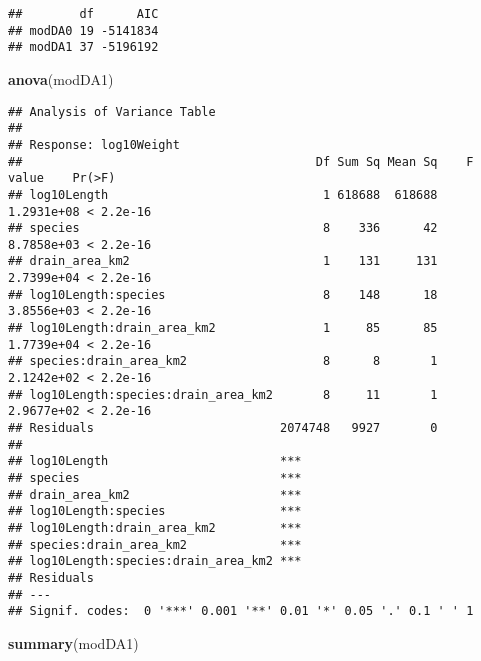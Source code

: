 \documentclass[
  landscape]{article}
\newenvironment{Shaded}{\begin{snugshade}}{\end{snugshade}}
\newcommand{\KeywordTok}[1]{\textcolor[rgb]{0.13,0.29,0.53}{\textbf{#1}}}
\newcommand{\NormalTok}[1]{#1}
\begin{document}
\begin{verbatim}
##        df      AIC
## modDA0 19 -5141834
## modDA1 37 -5196192
\end{verbatim}

\begin{Shaded}
\begin{Highlighting}[]
\KeywordTok{anova}\NormalTok{(modDA1)}
\end{Highlighting}
\end{Shaded}

\begin{verbatim}
## Analysis of Variance Table
## 
## Response: log10Weight
##                                         Df Sum Sq Mean Sq    F value    Pr(>F)
## log10Length                              1 618688  618688 1.2931e+08 < 2.2e-16
## species                                  8    336      42 8.7858e+03 < 2.2e-16
## drain_area_km2                           1    131     131 2.7399e+04 < 2.2e-16
## log10Length:species                      8    148      18 3.8556e+03 < 2.2e-16
## log10Length:drain_area_km2               1     85      85 1.7739e+04 < 2.2e-16
## species:drain_area_km2                   8      8       1 2.1242e+02 < 2.2e-16
## log10Length:species:drain_area_km2       8     11       1 2.9677e+02 < 2.2e-16
## Residuals                          2074748   9927       0                     
##                                       
## log10Length                        ***
## species                            ***
## drain_area_km2                     ***
## log10Length:species                ***
## log10Length:drain_area_km2         ***
## species:drain_area_km2             ***
## log10Length:species:drain_area_km2 ***
## Residuals                             
## ---
## Signif. codes:  0 '***' 0.001 '**' 0.01 '*' 0.05 '.' 0.1 ' ' 1
\end{verbatim}

\begin{Shaded}
\begin{Highlighting}[]
\KeywordTok{summary}\NormalTok{(modDA1)}
\end{Highlighting}
\end{Shaded}
\end{document}
